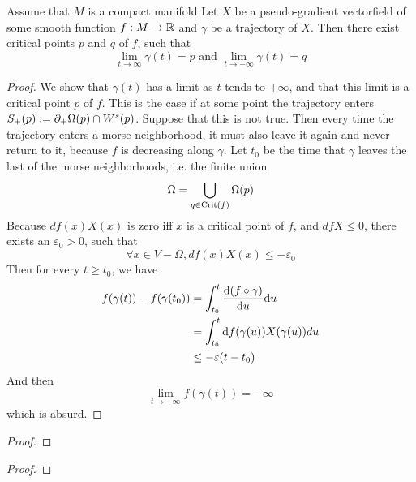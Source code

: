 \begin{prop}
    Assume that $M$ is a compact manifold Let $X$ be a pseudo-gradient vectorfield of some
    smooth function $f: M \to \R$ and $\gamma$ be a trajectory of $X$. Then there
    exist critical points $p$ and $q$ of $f$, such that
    \[ \lim_{t \to \infty} \gamma(t) = p \text{ and } \lim_{t \to -\infty} \gamma(t) = q \]
\end{prop}

\begin{proof}
    We show that $\gamma(t)$ has a limit as $t$ tends to $+ \infty$, and that this limit is
    a critical point $p$ of $f$. This is the case if at some point the trajectory enters 
    $S_+(p) := \del_+ \Omega(p) \cap W^s(p)$. Suppose that this is not true. Then every time 
    the trajectory enters a morse neighborhood, it must also leave it again and never return to
    it, because $f$ is decreasing along $\gamma$. Let $t_0$ be the time that $\gamma$ leaves the
    last of the morse neighborhoods, i.e. the finite union
    \[ \Omega = \bigcup_{q \in \Crit(f)} \Omega(p) \]
    Because $df(x)X(x)$ is zero iff $x$ is a critical point of $f$, and $dfX \leq 0$, there 
    exists an $\varepsilon_0 > 0$, such that 
    \[ \forall x \in V - \Omega, df(x)X(x) \leq - \varepsilon_0 \]
    Then for every $t \geq t_0$, we have 
    \begin{align*}
        f(\gamma(t)) - f(\gamma(t_0)) &= \int_{t_0}^t \derive[(f \circ \gamma)]{u} \opd u \\
        &= \int_{t_0}^t \opd f (\gamma(u))X(\gamma(u))du \\
        &\leq - \varepsilon (t - t_0)
    \end{align*}
    And then 
    \[ \lim_{t \to +\infty} f(\gamma(t)) = - \infty \]
    which is absurd.
\end{proof}

\begin{theorem}
\end{theorem}

\begin{proof}
\end{proof}

\begin{theorem}
\end{theorem}

\begin{proof}
\end{proof}

